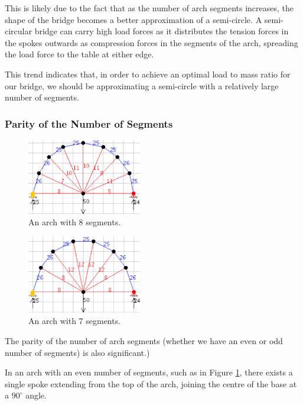 \documentclass[a4paper,11pt]{article}
\begin{document}
This is likely due to the fact that as the number of arch segments increases,
the shape of the bridge becomes a better approximation of a semi-circle.
A semi-circular bridge can carry high load forces as it distributes the tension
forces in the spokes outwards as compression forces in the segments of the arch,
spreading the load force to the table at either edge.

This trend indicates that, in order to achieve an optimal load to mass ratio for
our bridge, we should be approximating a semi-circle with a relatively large
number of segments.


\subsubsection{Parity of the Number of Segments}

\begin{figure}
\begin{center}
\includegraphics[width=5cm]{figures/arch-1.png}
\end{center}
\caption{An arch with 8 segments.}
\label{arch:8-segments}
\end{figure}

\begin{figure}
\begin{center}
\includegraphics[width=5cm]{figures/arch-2.png}
\end{center}
\caption{An arch with 7 segments.}
\label{arch:7-segments}
\end{figure}

The parity of the number of arch segments (whether we have an even or odd number
of segments) is also significant.)

In an arch with an even number of segments, such as in Figure
\ref{arch:8-segments}, there exists a single spoke extending from the top of
the arch, joining the centre of the base at a $90^\circ$ angle.
\end{document}

